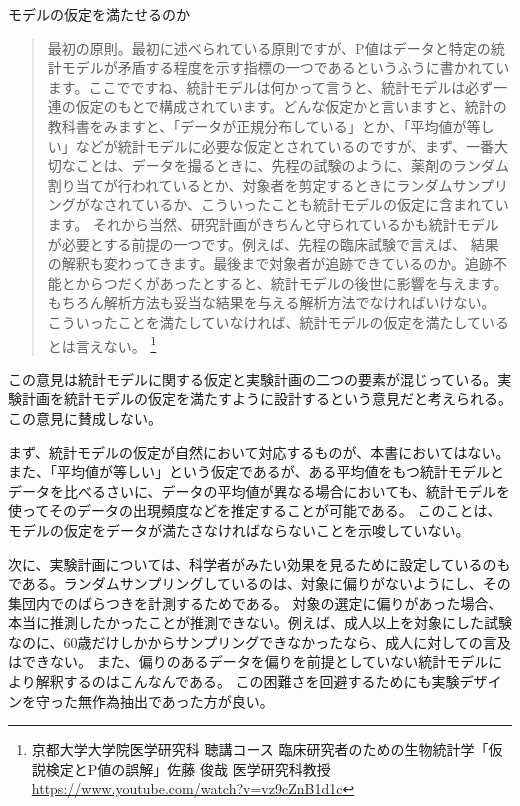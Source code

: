 \begin{SMbox}{モデルの仮定を満たせるのか}
    \ 
    \begin{quote}
    最初の原則。最初に述べられている原則ですが、P値はデータと特定の統計モデルが矛盾する程度を示す指標の一つであるというふうに書かれています。ここでですね、統計モデルは何かって言うと、統計モデルは必ず一連の仮定のもとで構成されています。どんな仮定かと言いますと、統計の教科書をみますと、「データが正規分布している」とか、「平均値が等しい」などが統計モデルに必要な仮定とされているのですが、まず、一番大切なことは、データを撮るときに、先程の試験のように、薬剤のランダム割り当てが行われているとか、対象者を剪定するときにランダムサンプリングがなされているか、こういったことも統計モデルの仮定に含まれています。
    それから当然、研究計画がきちんと守られているかも統計モデルが必要とする前提の一つです。例えば、先程の臨床試験で言えば、
    結果の解釈も変わってきます。最後まで対象者が追跡できているのか。追跡不能とからつだくがあったとすると、統計モデルの後世に影響を与えます。もちろん解析方法も妥当な結果を与える解析方法でなければいけない。
    こういったことを満たしていなければ、統計モデルの仮定を満たしているとは言えない。
    \footnote{京都大学大学院医学研究科 聴講コース 臨床研究者のための生物統計学「仮説検定とP値の誤解」佐藤 俊哉 医学研究科教授 \url{https://www.youtube.com/watch?v=vz9cZnB1d1c} }
    \end{quote}

    この意見は統計モデルに関する仮定と実験計画の二つの要素が混じっている。実験計画を統計モデルの仮定を満たすように設計するという意見だと考えられる。
    この意見に賛成しない。

     まず、統計モデルの仮定が自然において対応するものが、本書においてはない。また、「平均値が等しい」という仮定であるが、ある平均値をもつ統計モデルとデータを比べるさいに、データの平均値が異なる場合においても、統計モデルを使ってそのデータの出現頻度などを推定することが可能である。
     このことは、モデルの仮定をデータが満たさなければならないことを示唆していない。

     次に、実験計画については、科学者がみたい効果を見るために設定しているのもである。ランダムサンプリングしているのは、対象に偏りがないようにし、その集団内でのばらつきを計測するためである。
     対象の選定に偏りがあった場合、本当に推測したかったことが推測できない。例えば、成人以上を対象にした試験なのに、60歳だけしかからサンプリングできなかったなら、成人に対しての言及はできない。
     また、偏りのあるデータを偏りを前提としていない統計モデルにより解釈するのはこんなんである。
     この困難さを回避するためにも実験デザインを守った無作為抽出であった方が良い。
     


\end{SMbox}





